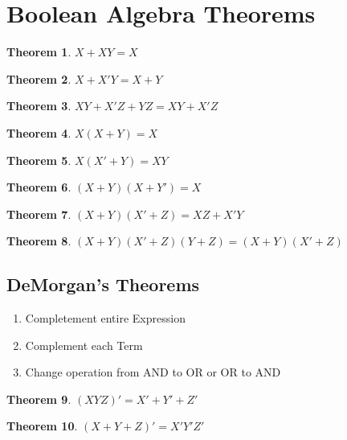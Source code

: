 \documentclass[12pt]{article}
\newtheorem{theorem}{Theorem}
\begin{document}
\section*{Boolean Algebra Theorems}

\begin{theorem}
    $X + XY = X$
\end{theorem}

\begin{theorem}
    $X + X'Y = X + Y$
\end{theorem}

\begin{theorem}
    $XY + X'Z + YZ = XY + X'Z$
\end{theorem}

\begin{theorem}
    $X (X + Y) = X$
\end{theorem}

\begin{theorem}
    $X (X' + Y) = XY$
\end{theorem}

\begin{theorem}
    $(X + Y)(X + Y') = X$
\end{theorem}

\begin{theorem}
    $(X + Y)(X' + Z) = XZ + X'Y$
\end{theorem}

\begin{theorem}
    $(X + Y)(X' + Z)(Y + Z) = (X + Y)(X' + Z)$
\end{theorem}

\subsection*{DeMorgan's Theorems}

\begin{enumerate}
    \item Completement entire Expression
    \item Complement each Term
    \item Change operation from AND to OR or OR to AND
\end{enumerate}

\begin{theorem}
    $(XYZ)' = X' + Y' + Z'$ 
\end{theorem}

\begin{theorem}
    $(X + Y + Z)' = X'Y'Z'$
\end{theorem}
\end{document}

